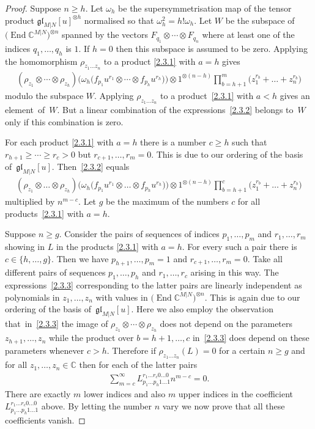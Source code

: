 \documentclass[11pt]{article}
\numberwithin{equation}{section}
\def\CC{{\mathbb{C}}}
\def\CMN{\CC^{M|N}}
\def\End{\operatorname{End}}
\def\g{\glMN [u]}
\def\ge{\geqslant}
\def\glMN{\mathfrak{gl}_{M|N}}
\def\om{\omega}
\def\ot{\otimes}
\begin{document}
\begin{proof}
Suppose $n\ge h $.
Let $\om_{h}$ be the supersymmetrisation map of
the tensor product $\glMN[u]^{\ot h}$ normalised so that
$\om_{h}^{2}=h ! \om_{h} $.
Let $W$ be the subspace
of $\big(\End\CMN\big)^{\ot n}$ spanned by the vectors
$F_{q_{1}}\ot\cdots\ot F_{q_{n}}$
where at least one
of the indices $q_{1},\dots, q_{h}$ is $1 $.
If $h=0$ then this subspace is assumed to be zero.
Applying the homomorphism
$\rho_{z_1\dots z_n}$ to a product \eqref{2.3.1}
with $a=h$ gives
\begin{gather}\label{2.3.2}
( \rho_{z_1}\ot\cdots\ot\rho_{z_{h}} )
\big( \om_{h}
\big( f_{p_1}u^{r_1}
\ot\cdots\ot
f_{p_{h}}u^{r_h} \big) \big)
\ot1^{\ot (n-h)}
\prod_{b=h+1}^m
\big( z_1^{r_b}+\dots+z_n^{r_b} \big)
\end{gather}
modulo the subspace $W$. Applying
$\rho_{z_1\dots z_n}$ to a product~\eqref{2.3.1}
with $a<h$ gives an element~of~$W$.
But a linear combination of the
expressions~\eqref{2.3.2} belongs to~$W$
only if this combination is zero.

For each product \eqref{2.3.1} with $a=h$
there is a number $c\ge h$ such that $r_{h+1}\ge\cdots\ge r_c>0$
but $r_{c+1} ,\dots, r_m=0 $.
This is due to our ordering of the basis of~$\g $.
Then~\eqref{2.3.2} equals
\begin{gather}\label{2.3.3}
( \rho_{z_1}\ot\dots\ot\rho_{z_{h}} )
\big( \om_{h}
\big( f_{p_1}u^{r_1}
\ot\dots\ot
f_{p_{h}}u^{r_h} \big) \big)
\ot1^{\ot (n-h)}
\prod_{b=h+1}^c
\big( z_1^{r_b}+\dots+z_n^{r_b} \big)
\end{gather}
multiplied by $n^{m-c}$.
Let $g$ be the maximum of the numbers $c$
for all products~\eqref{2.3.1} with $a=h $.

Suppose $n\ge g$. Consider the pairs of sequences of indices
$p_1,\dots, p_{m}$ and $r_1,\dots, r_m$
showing in $L$ in the products \eqref{2.3.1}
with $a=h$. For every such a pair there is
$c\in\{h,\dots, g \}$.
Then we have
$p_{h+1},\dots, p_{m}=1$ and $r_{c+1},\dots, r_m=0$.
Take all different pairs of sequences $p_1,\dots, p_{h}$ and $r_1,\dots, r_c$
arising in this way.
The expressions~\eqref{2.3.3} corresponding to the latter pairs
are linearly independent as polynomials in $z_1,\dots, z_n$
with values in $\big(\End\CMN\big)^{\ot n}$.
This is again due to our ordering of the basis of~$\g$.
Here we also employ the observation that~in~\eqref{2.3.3} the image of
$\rho_{z_1}\ot\cdots\ot\rho_{z_{h}}$
does not depend on the parameters $z_{h+1},\dots, z_n$
while the product over $b=h+1,\dots, c$ in~\eqref{2.3.3}
does depend on these parameters whenever $c>h$.
Therefore if $\rho_{z_1\ldots z_n}(L)=0$ for a certain $n\ge g$
and for all $z_1,\dots, z_n\in\CC$ then for each of the latter pairs
\begin{gather*}
\sum_{m=c}^\infty
L_{p_1\ldots p_h 1\ldots 1}^{r_1\ldots r_c 0\ldots 0} n^{m-c}=0.
\end{gather*}
There are exactly $m$ lower indices and also $m$ upper indices
in the coefficient
$L_{p_1\ldots p_h 1\ldots 1}^{r_1\ldots r_c 0\ldots 0}$ above.
By letting the number $n$ vary we now prove that all these
coefficients vanish.
\end{proof}
\end{document}
